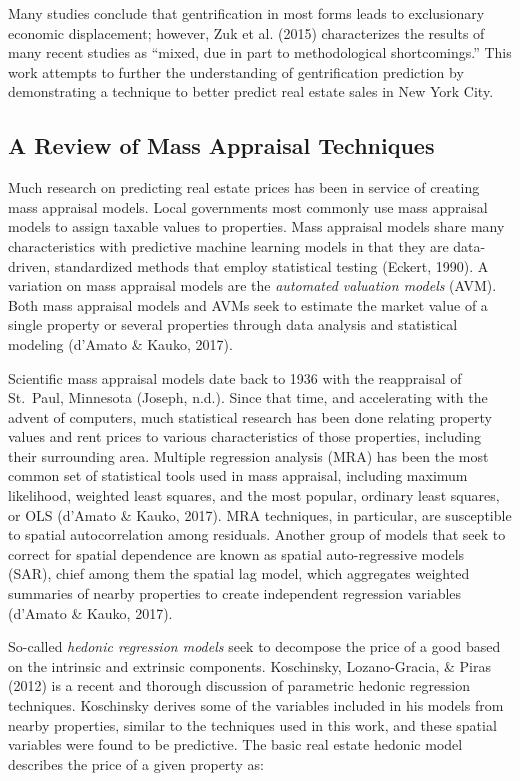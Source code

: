 \documentclass[conference,final,]{IEEEtran}
\begin{document}
Many studies conclude that gentrification in most forms leads to
exclusionary economic displacement; however, Zuk et al. (2015)
characterizes the results of many recent studies as ``mixed, due in part
to methodological shortcomings.'' This work attempts to further the
understanding of gentrification prediction by demonstrating a technique
to better predict real estate sales in New York City.

\hypertarget{a-review-of-mass-appraisal-techniques}{%
\subsection{A Review of Mass Appraisal
Techniques}\label{a-review-of-mass-appraisal-techniques}}

Much research on predicting real estate prices has been in service of
creating mass appraisal models. Local governments most commonly use mass
appraisal models to assign taxable values to properties. Mass appraisal
models share many characteristics with predictive machine learning
models in that they are data-driven, standardized methods that employ
statistical testing (Eckert, 1990). A variation on mass appraisal models
are the \emph{automated valuation models} (AVM). Both mass appraisal
models and AVMs seek to estimate the market value of a single property
or several properties through data analysis and statistical modeling
(d'Amato \& Kauko, 2017).

Scientific mass appraisal models date back to 1936 with the reappraisal
of St.~Paul, Minnesota (Joseph, n.d.). Since that time, and accelerating
with the advent of computers, much statistical research has been done
relating property values and rent prices to various characteristics of
those properties, including their surrounding area. Multiple regression
analysis (MRA) has been the most common set of statistical tools used in
mass appraisal, including maximum likelihood, weighted least squares,
and the most popular, ordinary least squares, or OLS (d'Amato \& Kauko,
2017). MRA techniques, in particular, are susceptible to spatial
autocorrelation among residuals. Another group of models that seek to
correct for spatial dependence are known as spatial auto-regressive
models (SAR), chief among them the spatial lag model, which aggregates
weighted summaries of nearby properties to create independent regression
variables (d'Amato \& Kauko, 2017).

So-called \emph{hedonic regression models} seek to decompose the price
of a good based on the intrinsic and extrinsic components. Koschinsky,
Lozano-Gracia, \& Piras (2012) is a recent and thorough discussion of
parametric hedonic regression techniques. Koschinsky derives some of the
variables included in his models from nearby properties, similar to the
techniques used in this work, and these spatial variables were found to
be predictive. The basic real estate hedonic model describes the price
of a given property as:
\end{document}
